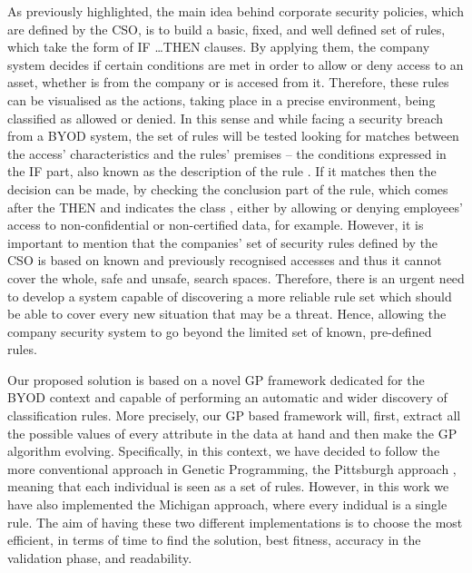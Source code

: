 \documentclass[runningheads]{llncs}
\begin{document}
As previously highlighted, the main idea behind corporate security
policies, which are defined by the CSO, is to build a basic, fixed,
and well defined set of rules, which take the form of \textsc{IF
  \ldots THEN} clauses. By applying them, the company system decides if certain conditions are met in order to allow or
deny access to an asset, whether is from the company or is accesed from it. 
Therefore, these rules can be visualised as the actions, taking place in a precise environment, being classified as
allowed or denied. In this sense and while facing a security breach
from a BYOD system, the set of rules will be tested looking for
matches between the access' characteristics and the rules' premises --
the conditions expressed in the IF part, also known as the description
of the rule \cite{DeFalco2002257}. If it matches then the decision can
be made, by checking the conclusion part of the rule, which comes
after the THEN and indicates the class \cite{DeFalco2002257}, either
by allowing or denying employees' access to non-confidential
 or non-certified data, for example. However, it is important to
 mention that the companies'  set of security rules defined by the CSO is
 based on known and previously recognised accesses and thus it cannot
 cover the whole, safe and unsafe, search spaces. Therefore,
 there is an urgent need to develop a system capable of discovering a
 more reliable rule set which should be able to cover every new
 situation that may be a threat. Hence, allowing the company security
 system to go beyond the limited set of known, pre-defined rules.  %

Our proposed solution is based on a novel GP framework dedicated for
the BYOD context and capable of performing an automatic and wider discovery of classification rules. More precisely, our GP based framework will, first, extract all the possible values of every attribute in the data at hand and then make the GP algorithm evolving. 
Specifically, in this context, we have decided to follow the more
conventional approach in Genetic Programming, the Pittsburgh approach
\cite{freitas2002data}, meaning that each individual is seen as a set
of rules. However, in this work we have also implemented the Michigan
approach, where every indidual is a single rule. The aim of having these two different implementations is to choose the most efficient, in terms of time to find the solution, best fitness, accuracy in the validation phase, and readability.
\end{document}
